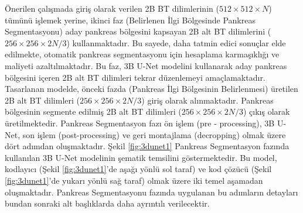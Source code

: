 Önerilen çalışmada giriş olarak verilen 2B BT dilimlerinin ($512 \times 512 \times N$) tümünü işlemek yerine, ikinci faz (Belirlenen İlgi Bölgesinde Pankreas Segmentasyonu) aday pankreas bölgesini kapsayan 2B alt BT dilimlerini ($256 \times 256 \times 2N/3$) kullanmaktadır. Bu sayede, daha tatmin edici sonuçlar elde edilmekte, otomatik pankreas segmentasyonu için hesaplama karmaşıklığı ve maliyeti azaltılmaktadır. Bu faz, 3B U-Net modelini kullanarak aday pankreas bölgesini içeren 2B alt BT dilimleri tekrar düzenlemeyi amaçlamaktadır. Tasarlanan modelde, önceki fazda (Pankreas İlgi Bölgesinin Belirlenmesi) üretilen 2B alt BT dilimleri ($256 \times 256 \times 2N/3$) giriş olarak alınmaktadır. Pankreas bölgesinin segmente edilmiş 2B alt BT dilimleri ($256 \times 256 \times 2N/3$) çıkış olarak üretilmektedir. Pankreas Segmentasyon fazı ön işlem (pre - processing), 3B U-Net, son işlem (post-processing) ve geri montajlama (decropping) olmak üzere dört adımdan oluşmaktadır. Şekil \ref{fig:3dunet1} Pankreas Segmentasyon fazında kullanılan 3B U-Net modelinin şematik temsilini göstermektedir. Bu model, kodlayıcı (Şekil \ref{fig:3dunet1}'de aşağı yönlü sol taraf) ve kod çözücü (Şekil \ref{fig:3dunet1}'de yukarı yönlü sağ taraf) olmak üzere iki temel aşamadan oluşmaktadır. Pankreas Segmentasyonu fazında uygulanan bu adımların detayları bundan sonraki alt başlıklarda daha ayrıntılı verilecektir. 

